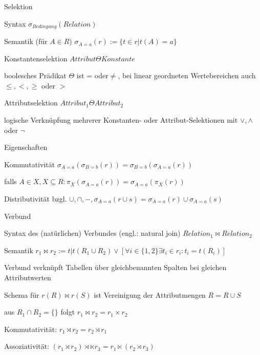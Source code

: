 \documentclass[a4paper]{article}
\begin{document}
\begin{multicols}{3}
Selektion
\begin{itemize*}
    \item Syntax $\sigma_{Bedingung} (Relation)$
    \item Semantik (für $A\in R$) $\sigma_{A=a}(r) := \{t \in r | t(A) = a\}$
    \item Konstantenselektion $Attribut \Theta Konstante$
    \begin{itemize*}
        \item boolesches Prädikat $\Theta$ ist = oder$\not=$, bei linear geordneten Wertebereichen auch $\leq, <, \geq$ oder $>$
    \end{itemize*}
    \item Attributselektion $Attribut_1 \Theta Attribut_2$
    \item logische Verknüpfung mehrerer Konstanten- oder Attribut-Selektionen mit $\vee, \wedge$ oder $\neg$
    \item Eigenschaften
    \begin{itemize*}
        \item Kommutativität $\sigma_{A=a}(\sigma_{B=b} (r)) = \sigma_{B=b} (\sigma_{A=a} (r))$
        \item falls $A\in X, X \subseteq R: \pi_X(\sigma_{A=a} (r)) = \sigma_{A=a} (\pi_{X} (r))$
        \item Distributivität bzgl. $\cup, \cap, - , \sigma_{A=a} (r \cup s) = \sigma_{A=a} (r) \cup \sigma_{A=a} (s)$
    \end{itemize*}
    \item Verbund
    \begin{itemize*}
        \item Syntax des (natürlichen) Verbundes (engl.: natural join) $Relation_1 \bowtie Relation_2$
        \item Semantik $r_1 \bowtie r_2 := {t | t(R_1\cup  R_2 ) \vee [\forall i \in \{1, 2\}\exists t_i \in r_i : t_i = t(R_i )]}$
        \item Verbund verknüpft Tabellen über gleichbenannten Spalten bei gleichen Attributwerten
        \item Schema für $r(R) \bowtie r(S)$ ist Vereinigung der Attributmengen $R = R \cup S$
        \item aus $R_1 \cap R_2 = \{\}$ folgt $r_1\bowtie r_2 = r_1 \times r_2$
        \item Kommutativität: $r_1 \rtimes r_2 = r_2 \rtimes r_1$
        \item Assoziativität: $(r_1 \rtimes r_2 ) \rtimes \ltimes r_3 = r_1 \ltimes (r_2 \rtimes r_3 )$

\end{itemize*}
\end{itemize*}
\end{multicols}
\end{document}
